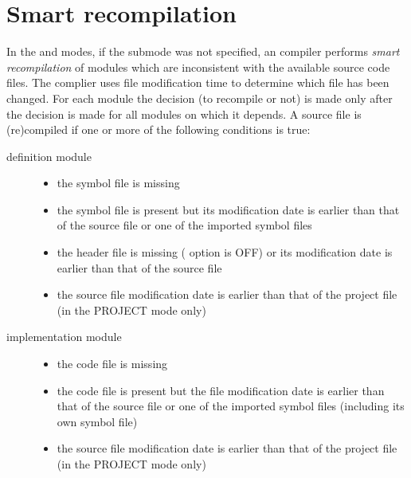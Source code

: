 
\section{Smart recompilation}\label{xc:smart}

In the  and 
modes, if the  submode was not specified,
an \XDS{} compiler performs {\em smart recompilation} of modules which are
inconsistent with the available source code files. The complier
uses file modification time to determine which file has been changed.
For each module the decision (to recompile or not) is made
only after the decision is made for all modules on which it depends.
A source file is (re)compiled if one or more of the following conditions is true:
\begin{description}
\item[\mt{} definition module] \mbox{}

        \begin{itemize}
        \item the symbol file is missing
        \item the symbol file is present but
          its modification date is earlier than that of the
          source file or one of the imported symbol files
        \ifgenc
          \item the header file is missing ( option is OFF)
          or its modification date is earlier than that of the source file
        \fi
\ifcomment
        \item the source file modification date is earlier than that
        of the project file (in the PROJECT mode only)
\fi
        \end{itemize}

\item[\mt{} implementation module] \mbox{}

        \begin{itemize}
        \item the code file is missing
        \item the code file is present but
          the file modification date is earlier than that of the
          source file or one of the imported symbol files
          (including its own symbol file)
\ifcomment
        \item the source file modification date is earlier than that
        of the project file (in the PROJECT mode only)
\fi
        \end{itemize}


\end{description}
